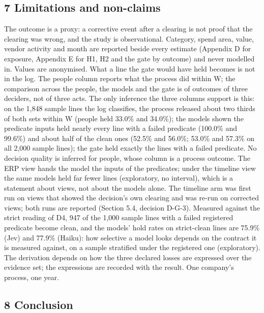 \documentclass[
  10pt,
]{article}
\begin{document}
\hypertarget{limitations-and-non-claims}{%
\subsection{7 Limitations and
non-claims}\label{limitations-and-non-claims}}

The outcome is a proxy: a corrective event after a clearing is not proof
that the clearing was wrong, and the study is observational. Category,
spend area, value, vendor activity and month are reported beside every
estimate (Appendix D for exposure, Appendix E for H1, H2 and the gate by
outcome) and never modelled in. Values are anonymised. What a line the
gate would have held becomes is not in the log. The people column
reports what the process did within W; the comparison across the people,
the models and the gate is of outcomes of three deciders, not of three
acts. The only inference the three columns support is this: on the 1,848
sample lines the log classifies, the process released about two thirds
of both sets within W (people held 33.0\% and 34.0\%); the models shown
the predicate inputs held nearly every line with a failed predicate
(100.0\% and 99.6\%) and about half of the clean ones (52.5\% and
56.0\%; 53.0\% and 57.3\% on all 2,000 sample lines); the gate held
exactly the lines with a failed predicate. No decision quality is
inferred for people, whose column is a process outcome. The ERP view
hands the model the inputs of the predicates; under the timeline view
the same models held far fewer lines (exploratory, no interval), which
is a statement about views, not about the models alone. The timeline arm
was first run on views that showed the decision's own clearing and was
re-run on corrected views; both runs are reported (Section 5.4, decision
D-G-3). Measured against the strict reading of D4, 947 of the 1,000
sample lines with a failed registered predicate become clean, and the
models' hold rates on strict-clean lines are 75.9\% (Jev) and 77.9\%
(Haiku): how selective a model looks depends on the contract it is
measured against, on a sample stratified under the registered one
(exploratory). The derivation depends on how the three declared losses
are expressed over the evidence set; the expressions are recorded with
the result. One company's process, one year.

\hypertarget{conclusion}{%
\subsection{8 Conclusion}\label{conclusion}}
\end{document}
